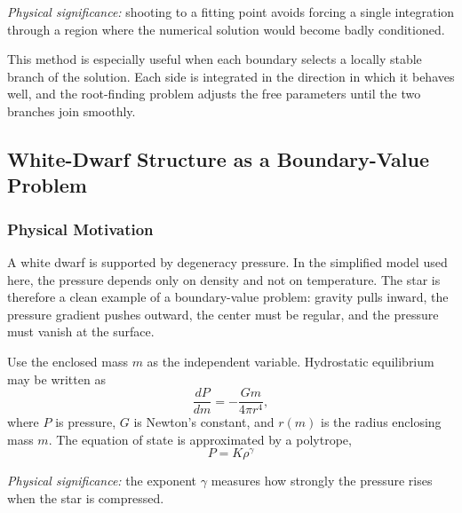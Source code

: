 \textit{Physical significance:} shooting to a fitting point avoids forcing a
single integration through a region where the numerical solution would
become badly conditioned.

This method is especially useful when each boundary selects a locally stable
branch of the solution. Each side is integrated in the direction in which it
behaves well, and the root-finding problem adjusts the free parameters until
the two branches join smoothly.

\subsection{White-Dwarf Structure as a Boundary-Value Problem}
\label{subsec:lec07:white-dwarf}

\subsubsection*{Physical Motivation}
A white dwarf is supported by degeneracy pressure. In the simplified model
used here, the pressure depends only on density and not on temperature. The
star is therefore a clean example of a boundary-value problem: gravity pulls
inward, the pressure gradient pushes outward, the center must be regular,
and the pressure must vanish at the surface.

Use the enclosed mass $m$ as the independent variable. Hydrostatic
equilibrium may be written as
\begin{equation}
    \frac{dP}{dm}
    =-\frac{Gm}{4\pi r^4},
    \label{eq:lec07:hydrostatic-mass}
\end{equation}
where $P$ is pressure, $G$ is Newton's constant, and $r(m)$ is the radius
enclosing mass $m$. The equation of state is approximated by a polytrope,
\begin{equation}
    \boxed{P=K\rho^\gamma}
    \label{eq:lec07:polytropic-eos}
\end{equation}

\textit{Physical significance:} the exponent $\gamma$ measures how strongly
the pressure rises when the star is compressed.

